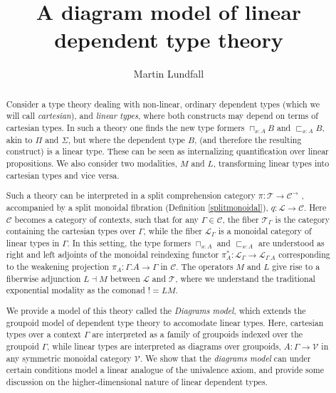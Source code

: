 \documentclass[a4paper,english]{lipics-v2018}
\title{A diagram model of linear dependent type theory}
\author{Martin Lundfall}{Stockholm University}{martin@dapp.org}{}{}%
\begin{document}
\maketitle

\begin{abstract}
Consider a type theory dealing with non-linear, ordinary dependent types (which we will call \textit{cartesian}), and \textit{linear types}, where both constructs may depend on terms of cartesian types. In such a theory one finds the new type formers $\sqcap_{x : A}B$ and $\sqsubset_{x : A}B$, akin to $\Pi$ and $\Sigma$, but where the dependent type $B$, (and therefore the resulting construct) is a linear type. These can be seen as internalizing quantification over linear propositions. We also consider two modalities, $M$ and $L$, transforming linear types into cartesian types and vice versa.

Such a theory can be interpreted in a split comprehension category $\pi : \mathcal{T} \to \mathcal{C}^\to$ \cite{jacobs}, accompanied by a split monoidal fibration (Definition \ref{splitmonoidal}), $q : \mathcal{L} \to \mathcal{C}$. Here $\mathcal{C}$ becomes a category of contexts, such that for any $\Gamma \in \mathcal{C}$, the fiber $\mathcal{T}_\Gamma$ is the category containing the cartesian types over $\Gamma$, while the fiber $\mathcal{L}_\Gamma$ is a monoidal category of linear types in $\Gamma$. In this setting, the type formers $\sqcap_{x :A}$ and $\sqsubset_{x : A}$ are understood as right and left adjoints of the monoidal reindexing functor $\pi_A^* : \mathcal{L}_\Gamma \to \mathcal{L}_{\Gamma.A}$ corresponding to the weakening projection $\pi_A : \Gamma.A \to \Gamma$ in $\mathcal{C}$. The operators $M$ and $L$ give rise to a fiberwise adjunction $L \dashv M$ between $\mathcal{L}$ and $\mathcal{T}$, where we understand the traditional exponential modality as the comonad $! = LM$.

We provide a model of this theory called the \textit{Diagrams model}, which extends the groupoid model of dependent type theory \cite{hofmann1998} to accomodate linear types. Here, cartesian types over a context $\Gamma$ are interpreted as a family of groupoids indexed over the groupoid $\Gamma$, while linear types are interpreted as diagrams over groupoids, $A : \Gamma \to \mathcal{V}$ in any symmetric monoidal category $\mathcal{V}$. We show that the \textit{diagrams model} can under certain conditions model a linear analogue of the univalence axiom, and provide some discussion on the higher-dimensional nature of linear dependent types.
\end{abstract}
\end{document}
